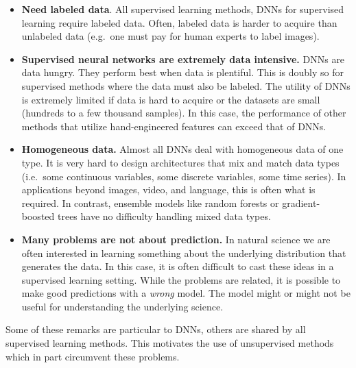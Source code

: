 \documentclass[%
oneside,                 %
final,                   %
10pt]{article}
\begin{document}
\begin{itemize}
\item \textbf{Need labeled data}. All supervised learning methods, DNNs for supervised learning require labeled data. Often, labeled data is harder to acquire than unlabeled data (e.g.~one must pay for human experts to label images).

\item \textbf{Supervised neural networks are extremely data intensive.} DNNs are data hungry. They perform best when data is plentiful. This is doubly so for supervised methods where the data must also be labeled. The utility of DNNs is extremely limited if data is hard to acquire or the datasets are small (hundreds to a few thousand samples). In this case, the performance of other methods that utilize hand-engineered features can exceed that of DNNs.

\item \textbf{Homogeneous data.} Almost all DNNs deal with homogeneous data of one type. It is very hard to design architectures that mix and match data types (i.e.~some continuous variables, some discrete variables, some time series). In applications beyond images, video, and language, this is often what is required. In contrast, ensemble models like random forests or gradient-boosted trees have no difficulty handling mixed data types.

\item \textbf{Many problems are not about prediction.} In natural science we are often interested in learning something about the underlying distribution that generates the data. In this case, it is often difficult to cast these ideas in a supervised learning setting. While the problems are related, it is possible to make good predictions with a \emph{wrong} model. The model might or might not be useful for understanding the underlying science.
\end{itemize}

\noindent
Some of these remarks are particular to DNNs, others are shared by all supervised learning methods. This motivates the use of unsupervised methods which in part circumvent these problems.




\end{document}
